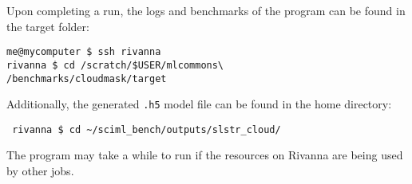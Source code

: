 Upon completing a run, the logs and benchmarks of the program can be
found in the target folder:

\begin{verbatim}
me@mycomputer $ ssh rivanna
rivanna $ cd /scratch/$USER/mlcommons\
/benchmarks/cloudmask/target
\end{verbatim}

Additionally, the generated \texttt{.h5} model file can be found in the
home directory:

\begin{verbatim}
 rivanna $ cd ~/sciml_bench/outputs/slstr_cloud/
 \end{verbatim}

The program may take a while to run if the resources on Rivanna are
being used by other jobs.
